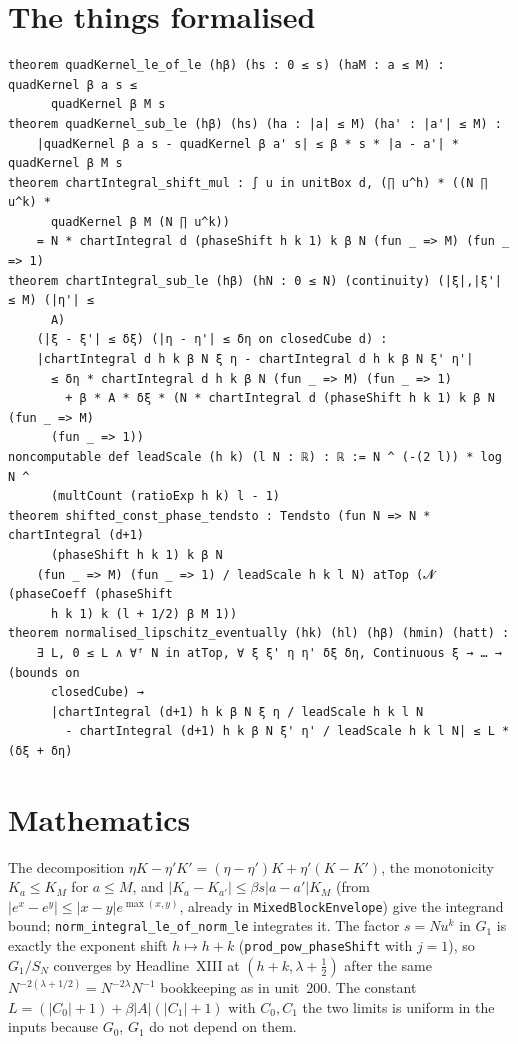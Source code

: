 \documentclass[11pt]{article}
\begin{document}
\section{The things formalised}
{\small
\begin{verbatim}
theorem quadKernel_le_of_le (hβ) (hs : 0 ≤ s) (haM : a ≤ M) : quadKernel β a s ≤
      quadKernel β M s
theorem quadKernel_sub_le (hβ) (hs) (ha : |a| ≤ M) (ha' : |a'| ≤ M) :
    |quadKernel β a s - quadKernel β a' s| ≤ β * s * |a - a'| * quadKernel β M s
theorem chartIntegral_shift_mul : ∫ u in unitBox d, (∏ u^h) * ((N ∏ u^k) *
      quadKernel β M (N ∏ u^k))
    = N * chartIntegral d (phaseShift h k 1) k β N (fun _ => M) (fun _ => 1)
theorem chartIntegral_sub_le (hβ) (hN : 0 ≤ N) (continuity) (|ξ|,|ξ'| ≤ M) (|η'| ≤
      A)
    (|ξ - ξ'| ≤ δξ) (|η - η'| ≤ δη on closedCube d) :
    |chartIntegral d h k β N ξ η - chartIntegral d h k β N ξ' η'|
      ≤ δη * chartIntegral d h k β N (fun _ => M) (fun _ => 1)
        + β * A * δξ * (N * chartIntegral d (phaseShift h k 1) k β N (fun _ => M)
      (fun _ => 1))
noncomputable def leadScale (h k) (l N : ℝ) : ℝ := N ^ (-(2 l)) * log N ^
      (multCount (ratioExp h k) l - 1)
theorem shifted_const_phase_tendsto : Tendsto (fun N => N * chartIntegral (d+1)
      (phaseShift h k 1) k β N
    (fun _ => M) (fun _ => 1) / leadScale h k l N) atTop (𝓝 (phaseCoeff (phaseShift
      h k 1) k (l + 1/2) β M 1))
theorem normalised_lipschitz_eventually (hk) (hl) (hβ) (hmin) (hatt) :
    ∃ L, 0 ≤ L ∧ ∀ᶠ N in atTop, ∀ ξ ξ' η η' δξ δη, Continuous ξ → … → (bounds on
      closedCube) →
      |chartIntegral (d+1) h k β N ξ η / leadScale h k l N
        - chartIntegral (d+1) h k β N ξ' η' / leadScale h k l N| ≤ L * (δξ + δη)
\end{verbatim}
}

\section{Mathematics}
The decomposition $\eta K-\eta'K'=(\eta-\eta')K+\eta'(K-K')$, the monotonicity $K_a\le K_M$ for
$a\le M$, and $|K_a-K_{a'}|\le\beta s|a-a'|K_M$ (from $|e^x-e^y|\le|x-y|e^{\max(x,y)}$, already in
\texttt{MixedBlockEnvelope}) give the integrand bound; \texttt{norm\_integral\_le\_of\_norm\_le}
integrates it. The factor $s=Nu^k$ in $G_1$ is exactly the exponent shift $h\mapsto h+k$
(\texttt{prod\_pow\_phaseShift} with $j=1$), so $G_1/S_N$ converges by Headline~XIII at
$(h+k,\lambda+\tfrac12)$ after the same $N^{-2(\lambda+1/2)}=N^{-2\lambda}N^{-1}$ bookkeeping as in
unit~200. The constant $L=(|C_0|+1)+\beta|A|(|C_1|+1)$ with $C_0,C_1$ the two limits is uniform in
the inputs because $G_0$, $G_1$ do not depend on them.
\end{document}
